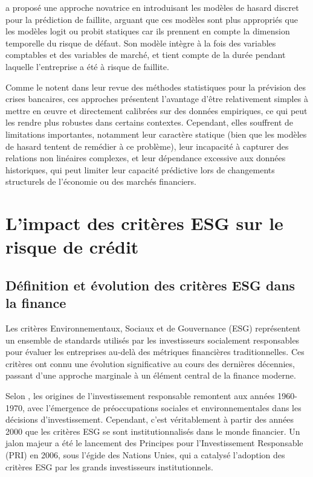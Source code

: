 \citet{shumway2001} a proposé une approche novatrice en introduisant les modèles de hasard discret pour la prédiction de faillite, arguant que ces modèles sont plus appropriés que les modèles logit ou probit statiques car ils prennent en compte la dimension temporelle du risque de défaut. Son modèle intègre à la fois des variables comptables et des variables de marché, et tient compte de la durée pendant laquelle l'entreprise a été à risque de faillite.

Comme le notent \citet{demyanyk2010} dans leur revue des méthodes statistiques pour la prévision des crises bancaires, ces approches présentent l'avantage d'être relativement simples à mettre en œuvre et directement calibrées sur des données empiriques, ce qui peut les rendre plus robustes dans certains contextes. Cependant, elles souffrent de limitations importantes, notamment leur caractère statique (bien que les modèles de hasard tentent de remédier à ce problème), leur incapacité à capturer des relations non linéaires complexes, et leur dépendance excessive aux données historiques, qui peut limiter leur capacité prédictive lors de changements structurels de l'économie ou des marchés financiers.

\section{L'impact des critères ESG sur le risque de crédit}

\subsection{Définition et évolution des critères ESG dans la finance}

Les critères Environnementaux, Sociaux et de Gouvernance (ESG) représentent un ensemble de standards utilisés par les investisseurs socialement responsables pour évaluer les entreprises au-delà des métriques financières traditionnelles. Ces critères ont connu une évolution significative au cours des dernières décennies, passant d'une approche marginale à un élément central de la finance moderne.

Selon \citet{eccles2018}, les origines de l'investissement responsable remontent aux années 1960-1970, avec l'émergence de préoccupations sociales et environnementales dans les décisions d'investissement. Cependant, c'est véritablement à partir des années 2000 que les critères ESG se sont institutionnalisés dans le monde financier. Un jalon majeur a été le lancement des Principes pour l'Investissement Responsable (PRI) en 2006, sous l'égide des Nations Unies, qui a catalysé l'adoption des critères ESG par les grands investisseurs institutionnels.

